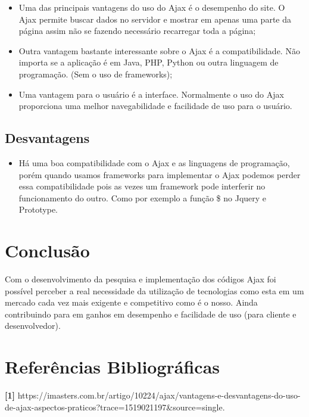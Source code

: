 \documentclass[12pt,a4paper]{article}
\begin{document}
\begin{itemize}
\item Uma das principais vantagens do uso do Ajax é o desempenho do site. O Ajax permite buscar  dados no servidor e mostrar em apenas uma parte da página assim não se fazendo necessário recarregar toda a página;

\item Outra vantagem bastante interessante sobre o Ajax é a compatibilidade. Não importa se a aplicação é em Java, PHP, Python ou outra linguagem de programação. (Sem o uso de frameworks);

\item Uma vantagem para o usuário é a interface. Normalmente o uso do Ajax proporciona uma melhor navegabilidade e facilidade de uso para o usuário.


\end{itemize}

\subsection{Desvantagens}

\begin{itemize}
\item Há uma boa compatibilidade com o Ajax e as linguagens de programação, porém quando usamos frameworks para implementar o Ajax podemos perder essa compatibilidade pois as vezes um framework pode interferir no funcionamento do outro. Como por exemplo a função \$ no Jquery e Prototype.

\end{itemize}

\section{Conclusão}

Com o desenvolvimento da pesquisa e implementação dos códigos Ajax foi possível perceber a real necessidade da utilização de tecnologias como esta em um mercado cada vez mais exigente e competitivo como é o nosso. Ainda contribuindo para em ganhos em desempenho e facilidade de uso (para cliente e desenvolvedor).



\section{Referências Bibliográficas}

\noindent \textbf{[1]} {https://imasters.com.br/artigo/10224/ajax/vantagens-e-desvantagens-do-uso-de-ajax-aspectos-praticos?trace=1519021197\&source=single.}\\\vspace{0.2cm}
\end{document}
